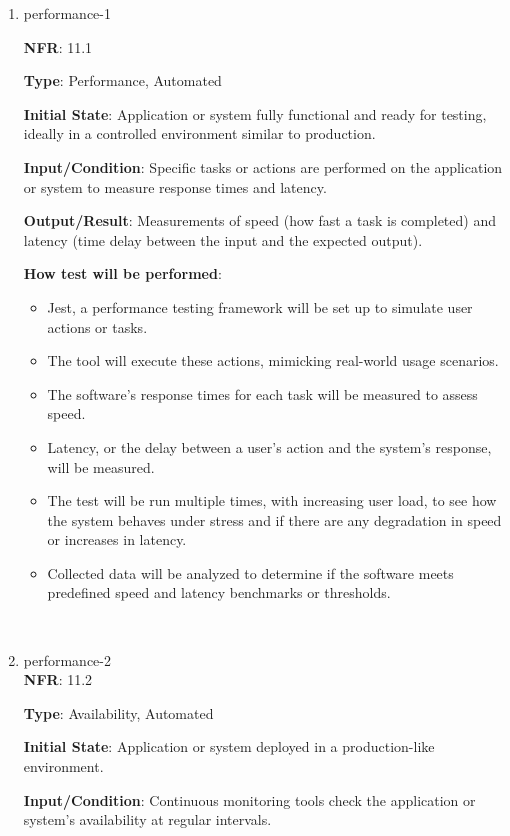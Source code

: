 \documentclass[12pt, titlepage]{article}
\begin{document}
\begin{enumerate}

\item{performance-1\\}

\textbf{NFR}: 11.1

\textbf{Type}: Performance, Automated

\textbf{Initial State}: Application or system fully functional and ready for testing, ideally in a controlled environment similar to production.

\textbf{Input/Condition}: Specific tasks or actions are performed on the application or system to measure response times and latency.

\textbf{Output/Result}: Measurements of speed (how fast a task is completed) and latency (time delay between the input and the expected output).

\textbf{How test will be performed}: 
\begin{itemize}
    \item Jest, a performance testing framework will be set up to simulate user actions or tasks.
    \item The tool will execute these actions, mimicking real-world usage scenarios.
    \item The software's response times for each task will be measured to assess speed.
    \item Latency, or the delay between a user's action and the system's response, will be measured.
    \item The test will be run multiple times, with increasing user load, to see how the system behaves under stress and if there are any degradation in speed or increases in latency.
    \item Collected data will be analyzed to determine if the software meets predefined speed and latency benchmarks or thresholds.
\end{itemize}\\

\item{performance-2 \\}
\textbf{NFR}: 11.2

\textbf{Type}: Availability, Automated

\textbf{Initial State}: Application or system deployed in a production-like environment.

\textbf{Input/Condition}: Continuous monitoring tools check the application or system's availability at regular intervals.


\end{enumerate}
\end{document}
